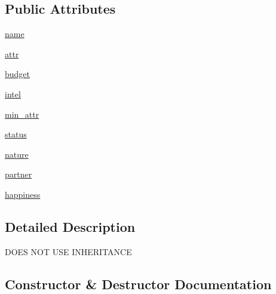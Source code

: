 \subsection*{Public Attributes}
\begin{DoxyCompactItemize}
\item 
\hyperlink{classboys_1_1boy__uninherited_1_1_boy_a4009413656c9d8057fc54545dce28df8}{name}
\item 
\hyperlink{classboys_1_1boy__uninherited_1_1_boy_afac2cde2111761c12ac48f3339f4c659}{attr}
\item 
\hyperlink{classboys_1_1boy__uninherited_1_1_boy_a0abd7cec036a08b7d7fb23db1709246d}{budget}
\item 
\hyperlink{classboys_1_1boy__uninherited_1_1_boy_a8069384d8d8dd16683ba292ac2b043b0}{intel}
\item 
\hyperlink{classboys_1_1boy__uninherited_1_1_boy_a95366dbf37df96f53c361a980791f4e7}{min\+\_\+attr}
\item 
\hyperlink{classboys_1_1boy__uninherited_1_1_boy_a54bb9865e7dfb35e804b976d2d94a174}{status}
\item 
\hyperlink{classboys_1_1boy__uninherited_1_1_boy_aea7eb7c4e32a8490a7280a8cb99f036d}{nature}
\item 
\hyperlink{classboys_1_1boy__uninherited_1_1_boy_aa70bd494f431eff2fad089ac5ccf9403}{partner}
\item 
\hyperlink{classboys_1_1boy__uninherited_1_1_boy_a7de8536ac2f0ddaaf0dd4b7ffbba7e87}{happiness}
\end{DoxyCompactItemize}


\subsection{Detailed Description}
\begin{DoxyVerb}DOES NOT USE INHERITANCE\end{DoxyVerb}
 

\subsection{Constructor \& Destructor Documentation}
